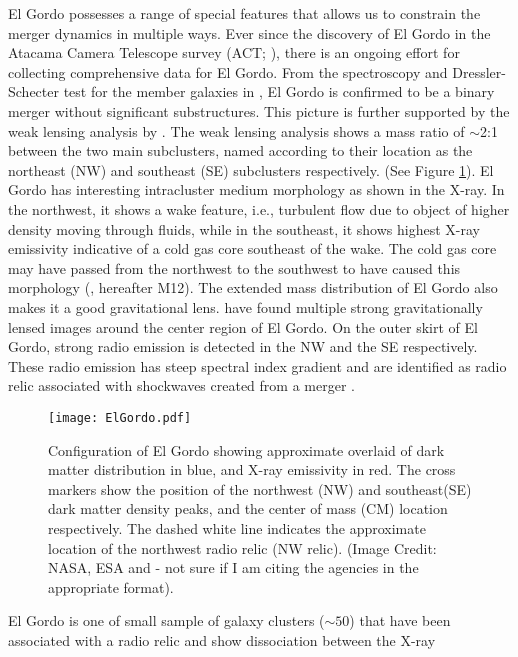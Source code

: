 El Gordo possesses a range of special features that allows us to constrain
the merger dynamics in multiple ways.  Ever since the discovery of El Gordo
in the Atacama Camera Telescope survey (ACT; \citealt{Marriage11}), there is an ongoing effort for
collecting comprehensive data for El Gordo.
From the spectroscopy and Dressler-Schecter test for the member galaxies
in \cite{Sifon13}, El Gordo is confirmed to be a binary merger 
without significant substructures. This picture is further supported by the
weak lensing analysis by \cite{Jee13}. The weak lensing analysis shows
a mass ratio of $\sim$2:1  between the two main subclusters, named according to their location as the northeast (NW) and southeast (SE) subclusters respectively. 
(See Figure \ref{fig:config}). El Gordo has interesting intracluster medium morphology as shown in the X-ray. In the northwest, it shows a wake feature, i.e.,
turbulent flow due to object of higher density moving through fluids, while in the southeast, it shows
highest X-ray emissivity indicative of a cold gas core southeast of the
wake. The cold gas core may have passed from the northwest to the southwest
to have caused this morphology (\citealt{M12}, hereafter M12). 
The extended mass distribution of El Gordo also makes it a good
gravitational lens. \cite{Zitrin13} have found multiple strong
gravitationally lensed images around the center region of El Gordo. 
On the outer skirt of El Gordo, strong radio emission is detected in
the NW and the SE respectively. These radio emission has steep spectral
index gradient and are identified as radio relic associated with shockwaves
created from a merger \citep{L13}. 
\begin{figure}
	\texttt{[image: ElGordo.pdf]}
	\caption{Configuration of El Gordo showing approximate overlaid of dark
		matter distribution in blue, and X-ray emissivity in red. The cross
		markers show the position of the northwest (NW) and southeast(SE) dark
		matter density peaks, and the center of mass (CM) location respectively.   
		The dashed white line indicates the approximate location of the northwest 
		radio relic (NW relic).
		(Image Credit: NASA, ESA and \citealt{Jee13} - not sure if I am citing
		the agencies in the appropriate format). 
		\label{fig:config}}
\end{figure}
El Gordo is one of small sample of galaxy clusters ($\sim50$) that have
been associated with a radio relic and show dissociation between the X-ray
